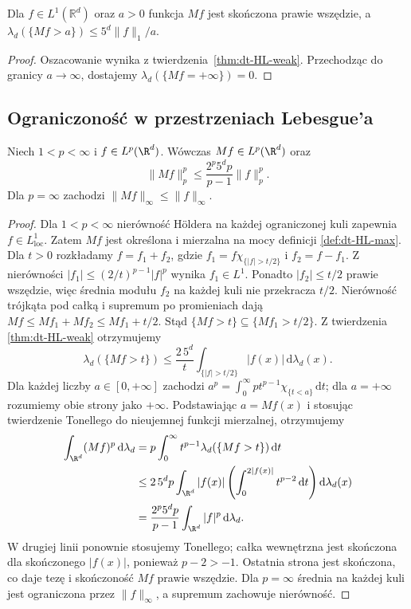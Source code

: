 \begin{wniosek}
\label{cor:dt-HL-level}
Dla $f\in L^1(\mathbb R^d)$ oraz $a>0$ funkcja $Mf$
jest skończona prawie wszędzie, a
$\lambda_d(\{Mf>a\})\le5^d\|f\|_1/a$.
\end{wniosek}
\begin{proof}
Oszacowanie wynika z twierdzenia~\ref{thm:dt-HL-weak}.
Przechodząc do granicy $a\to\infty$, dostajemy
$\lambda_d(\{Mf=+\infty\})=0$.
\end{proof}


\subsection{Ograniczoność w przestrzeniach Lebesgue'a}

\begin{twierdzenie}
\label{thm:dt-HL-strong}
Niech $1<p<\infty$ i $f\in L^p(\R^d)$.
Wówczas $Mf\in L^p(\R^d)$ oraz
\[
 \|Mf\|_p^p\le \frac{2^p5^d p}{p-1}\|f\|_p^p.
\]
Dla $p=\infty$ zachodzi $\|Mf\|_\infty\le\|f\|_\infty$.
\end{twierdzenie}
\begin{proof}
Dla $1<p<\infty$ nierówność Höldera na każdej
ograniczonej kuli zapewnia $f\in L^1_{\mathrm{loc}}$.
Zatem $Mf$ jest określona i mierzalna na mocy
definicji \ref{def:dt-HL-max}. Dla $t>0$ rozkładamy
$f=f_1+f_2$, gdzie
$f_1=f\chi_{\{|f|>t/2\}}$ i $f_2=f-f_1$.
Z nierówności $|f_1|\le(2/t)^{p-1}|f|^p$
wynika $f_1\in L^1$. Ponadto $|f_2|\le t/2$
prawie wszędzie, więc średnia modułu $f_2$
na każdej kuli nie przekracza $t/2$.
Nierówność trójkąta pod całką i supremum po promieniach
dają $Mf\le Mf_1+Mf_2\le Mf_1+t/2$.
Stąd $\{Mf>t\}\subseteq\{Mf_1>t/2\}$.
Z twierdzenia \ref{thm:dt-HL-weak} otrzymujemy
\[
 \lambda_d(\{Mf>t\})
 \le \frac{2\,5^d}{t}
 \int_{\{|f|>t/2\}}|f(x)|\,\mathrm d\lambda_d(x).
\]
Dla każdej liczby $a\in[0,+\infty]$ zachodzi
$a^p=\int_0^\infty p t^{p-1}\chi_{\{t<a\}}\,\mathrm dt$;
dla $a=+\infty$ rozumiemy obie strony jako $+\infty$.
Podstawiając $a=Mf(x)$ i stosując twierdzenie Tonellego
do nieujemnej funkcji mierzalnej, otrzymujemy
\[
 \begin{aligned}
 \int_{\R^d}(Mf)^p\,\mathrm d\lambda_d
 &=p\int_0^\infty t^{p-1}
            \lambda_d(\{Mf>t\})\,\mathrm dt\\
 &\le 2\,5^d p\int_{\R^d}|f(x)|
       \left(\int_0^{2|f(x)|}t^{p-2}\,\mathrm dt\right)
       \mathrm d\lambda_d(x)\\
 &=\frac{2^p5^d p}{p-1}\int_{\R^d}|f|^p\,\mathrm d\lambda_d.
 \end{aligned}
\]
W drugiej linii ponownie stosujemy Tonellego;
całka wewnętrzna jest skończona dla skończonego
$|f(x)|$, ponieważ $p-2>-1$. Ostatnia strona
jest skończona, co daje tezę i skończoność $Mf$
prawie wszędzie.
Dla $p=\infty$ średnia na każdej kuli jest
ograniczona przez $\|f\|_\infty$, a supremum
zachowuje nierówność.
\end{proof}

